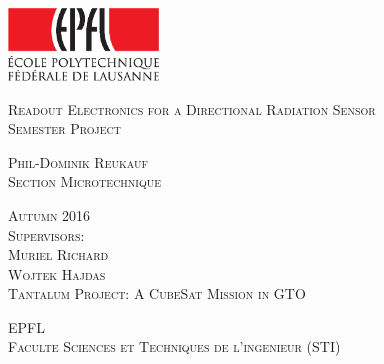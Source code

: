 


\newcommand{\Ptype}{Semester Project} %
\newcommand{\Ptitle}{Readout Electronics for a Directional Radiation Sensor}
\newcommand{\Pcand}{Phil-Dominik Reukauf}
\newcommand{\Psect}{Section Microtechnique}
\newcommand{\Pfirst}{Muriel Richard}
\newcommand{\Psecond}{Wojtek Hajdas}
\newcommand{\Pseason}{Autumn 2016} %



\begin{titlepage}

\begin{center}


\includegraphics[width=4cm]{logo_epfl_coul.eps}

\vspace*{4cm}
\Huge
\textsc{\Ptitle}\\
\vspace{0.5cm}
\vspace{0.5cm}
\normalsize
\textsc{\Ptype }\\ %
\vspace{1cm}

\large
\textsc{\Pcand\\[0.5\baselineskip] }
\normalsize
\textsc{\Psect}\\
\vspace{0.6cm}

\textsc{\Pseason}\\ %
\vspace{0.6cm}
\textsc{Supervisors:\\ \Pfirst\\ \Psecond}\\
\vspace{0.6cm}
\textsc{Tantalum Project: A CubeSat Mission in GTO}


\vspace{0.6cm}
\textsc{EPFL\\
Faculte Sciences et Techniques de l'ingenieur (STI)}\\

\end{center}

\end{titlepage}
